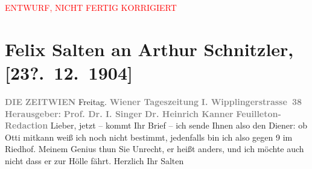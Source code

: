 
\begin{center}
            \textcolor{red}{ENTWURF, NICHT FERTIG KORRIGIERT}
                      \end{center}
            
         
         \renewcommand{\erwaehntePersonen}{Personen: Heinrich Kanner, Ottilie Salten, Isidor Singer}
         \renewcommand{\erwaehnteInstitutionen}{Institutionen: Die Zeit}
         \renewcommand{\erwaehnteOrte}{Orte: Riedhof, Wien, Wipplingerstraße}
         \renewcommand{\erwaehnteWerke}{}
               \section[Felix Salten an Arthur Schnitzler, {[}23?. 12. 1904{]}]{ Felix Salten an Arthur Schnitzler, {[}23?. 12. 1904{]}}\nopagebreak{}\rehead{ }\begin{ledgroupsized}[t]{13cm}\normalsize\beginnumbering \toendnotes[C]{\smallbreak\pagebreak[2]} 
\toendnotes[C]{\smallbreak}\pstart
           \noindent{}{\pb}\textcolor{gray}{\textbf{DIE}}\pend
           \pstart
           \textcolor{gray}{\textbf{ZEIT}}\hfill \textcolor{gray}{\textbf{WIEN}}{ }Freitag. \pend
           \pstart
           \textcolor{gray}{\textbf{Wiener Tageszeitung }}\hfill \textcolor{gray}{\textbf{I. Wipplingerstrasse 38}}\pend
           \pstart
           \textcolor{gray}{\textbf{Herausgeber: }}\pend
           \pstart
           \textcolor{gray}{\textbf{Prof. Dr. I. Singer}}\pend
           \pstart
           \textcolor{gray}{\textbf{Dr. Heinrich Kanner}}\pend
           \pstart
           \textcolor{gray}{\textbf{Feuilleton-Redaction}}\pend
           \pstart
           Lieber, jetzt – \label{K_L03404-1v}\label{K_L03404-1h} kommt Ihr Brief –
               ich sende Ihnen also den Diener: ob Otti
               mitkann weiß ich noch nicht bestimmt, jedenfalls bin ich also gegen 9 im Riedhof. \pend
           \pstart
           Meinem Genius thun Sie Unrecht, er heißt anders, und ich möchte auch nicht dass er
               zur Hölle fährt. \pend
           \pstart Herzlich Ihr \spacefill\mbox{Salten}\pend{}
         

\end{ledgroupsized}
